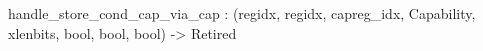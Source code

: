 handle_store_cond_cap_via_cap : (regidx, regidx, capreg_idx, Capability, xlenbits, bool, bool, bool) -> Retired